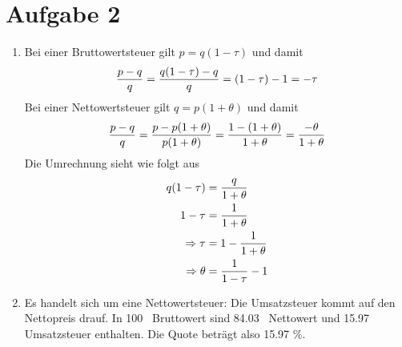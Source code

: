 \documentclass{article}
\begin{document}
	\section*{Aufgabe 2}
	\begin{enumerate}[label=(\alph*)]
		\item Bei einer Bruttowertsteuer gilt $p=q(1-\tau)$ und damit
		\begin{align}
			\frac{p-q}{q} = \frac{q(1-\tau)-q}{q} = (1-\tau)-1 = -\tau \notag
		\end{align}
		Bei einer Nettowertsteuer gilt $q=p(1+\theta)$ und damit
		\begin{align}
			\frac{p-q}{q} = \frac{p - p(1+\theta)}{p(1+\theta)} = \frac{1-(1+\theta)}{1+\theta} = \frac{-\theta}{1+\theta} \notag
		\end{align}
		Die Umrechnung sieht wie folgt aus
		\begin{align}
			q(1-\tau) &= \frac{q}{1+\theta} \notag \\
			1-\tau &= \frac{1}{1+\theta} \notag \\
			\Rightarrow \tau &= 1-\frac{1}{1+\theta} \notag \\
			\Rightarrow \theta &= \frac{1}{1-\tau}-1 \notag
		\end{align}
		\item Es handelt sich um eine Nettowertsteuer: Die Umsatzsteuer kommt auf den Nettopreis drauf. In 100 \EUR\, Bruttowert sind 84.03 \EUR\, Nettowert und 15.97 \EUR\, Umsatzsteuer enthalten. Die Quote beträgt also 15.97 \%.
	\end{enumerate}
\end{document}
